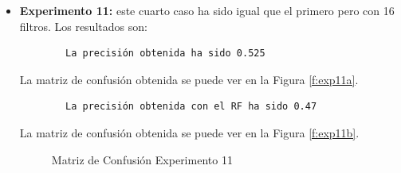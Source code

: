 \begin{itemize}
    \item \textbf{Experimento 11:} este cuarto caso ha sido igual que el primero pero con 16 filtros. Los resultados son:
    \begin{verbatim}
        La precisión obtenida ha sido 0.525
    \end{verbatim}
    La matriz de confusión obtenida se puede ver en la Figura \ref{f:exp11a}.
    \begin{verbatim}
        La precisión obtenida con el RF ha sido 0.47
    \end{verbatim}
    La matriz de confusión obtenida se puede ver en la Figura \ref{f:exp11b}.
    \begin{figure}[h]
     \centering
     \caption{Matriz de Confusión Experimento 11}
     \label{f:exp11}
    \end{figure}
    

\end{itemize}

